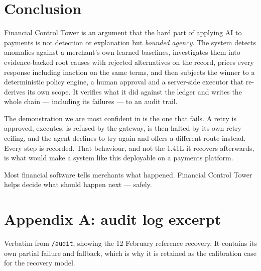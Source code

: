 \documentclass[10pt,twocolumn,a4paper]{article}
\newcommand{\rs}{\rupee}%
\newcommand{\rs}{\textrm{INR}\,}%
\newcommand{\code}[1]{\texttt{\small #1}}
\begin{document}
\section{Conclusion}

Financial Control Tower is an argument that the hard part of applying AI to
payments is not detection or explanation but \emph{bounded agency}. The system
detects anomalies against a merchant's own learned baselines, investigates them
into evidence-backed root causes with rejected alternatives on the record, prices
every response including inaction on the same terms, and then subjects the winner
to a deterministic policy engine, a human approval and a server-side executor
that re-derives its own scope. It verifies what it did against the ledger and
writes the whole chain --- including its failures --- to an audit trail.

The demonstration we are most confident in is the one that fails. A retry is
approved, executes, is refused by the gateway, is then halted by its own retry
ceiling, and the agent declines to try again and offers a different route
instead. Every step is recorded. That behaviour, and not the \rs{}1.41L it
recovers afterwards, is what would make a system like this deployable on a
payments platform.

Most financial software tells merchants what happened. Financial Control Tower
helps decide what should happen next --- safely.

\appendix
\onecolumn
\section{Appendix A: audit log excerpt}

Verbatim from \code{/audit}, showing the 12 February reference recovery. It
contains its own partial failure and fallback, which is why it is retained as the
calibration case for the recovery model.
\end{document}

